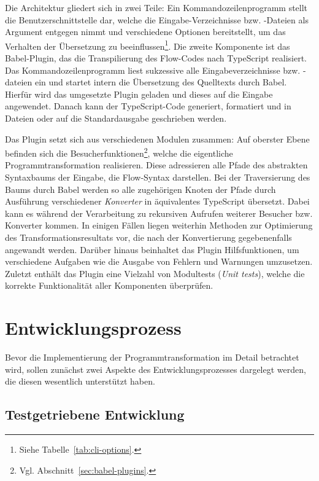 Die Architektur gliedert sich in zwei Teile: Ein Kommandozeilenprogramm stellt die Benutzerschnittstelle dar, welche die Eingabe-Verzeichnisse bzw. -Dateien als Argument entgegen nimmt und verschiedene Optionen bereitstellt, um das Verhalten der Übersetzung zu beeinflussen\footnote{Siehe Tabelle~\ref{tab:cli-options}.}. Die zweite Komponente ist das Babel-Plugin, das die Transpilierung des Flow-Codes nach TypeScript realisiert. Das Kommandozeilenprogramm liest sukzessive alle Eingabeverzeichnisse bzw. -dateien ein und startet intern die Übersetzung des Quelltexts durch Babel. Hierfür wird das umgesetzte Plugin geladen und dieses auf die Eingabe angewendet. Danach kann der TypeScript-Code generiert, formatiert und in Dateien oder auf die Standardausgabe geschrieben werden.

Das Plugin setzt sich aus verschiedenen Modulen zusammen: Auf oberster Ebene befinden sich die Besucherfunktionen\footnote{Vgl. Abschnitt~\ref{sec:babel-plugins}.}, welche die eigentliche Programmtransformation realisieren. Diese adressieren alle Pfade des abstrakten Syntaxbaums der Eingabe, die Flow-Syntax darstellen. Bei der Traversierung des Baums durch Babel werden so alle zugehörigen Knoten der Pfade durch Ausführung verschiedener \emph{Konverter} in äquivalentes TypeScript übersetzt. Dabei kann es während der Verarbeitung zu rekursiven Aufrufen weiterer Besucher bzw. Konverter kommen. In einigen Fällen liegen weiterhin Methoden zur Optimierung des Transformationsresultats vor, die nach der Konvertierung gegebenenfalls angewandt werden. Darüber hinaus beinhaltet das Plugin Hilfsfunktionen, um verschiedene Aufgaben wie die Ausgabe von Fehlern und Warnungen umzusetzen. Zuletzt enthält das Plugin eine Vielzahl von Modultests (\textit{Unit tests}), welche die korrekte Funktionalität aller Komponenten überprüfen.

\section{Entwicklungsprozess}

Bevor die Implementierung der Programmtransformation im Detail betrachtet wird, sollen zunächst zwei Aspekte des Entwicklungsprozesses dargelegt werden, die diesen wesentlich unterstützt haben.

\subsection{Testgetriebene Entwicklung}
\label{sec:tdd}

